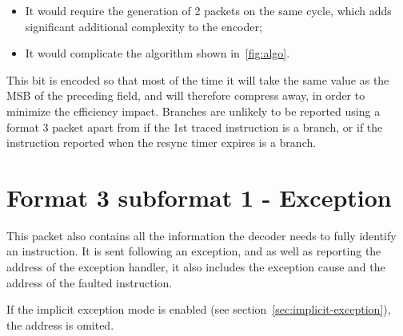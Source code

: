 \begin{itemize}
  \item It would require the generation of 2 packets on the same cycle, which adds significant additional complexity
    to the encoder;
  \item It would complicate the algorithm shown in~\ref{fig:algo}. 
\end{itemize}

This bit is encoded so that most of the time it will take the same value as the MSB of the preceding field, and will
therefore compress away, in order to minimize the efficiency impact.  Branches are unlikely to be reported using a
format 3 packet apart from if the 1st traced instruction is a branch, or if the instruction reported when the 
resync timer expires is a branch.

\FloatBarrier
\section{Format 3 subformat 1 - Exception} \label{sec:format31}

This packet also contains all the information the decoder needs to fully identify an instruction.
It is sent following an exception, and as well as reporting the address of the exception handler, it also 
includes the exception cause and the address of the faulted instruction.

If the implicit exception mode is enabled (see section~\ref{sec:implicit-exception}), the address is omited.


